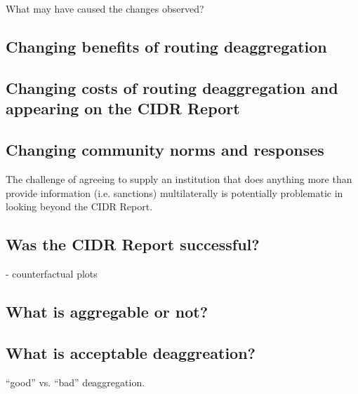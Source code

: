 \chapter{}
\label{chap:discussion}


What may have caused the changes observed?

\section{Changing benefits of routing deaggregation}
\section{Changing costs of routing deaggregation and appearing on the CIDR Report}
\section{Changing community norms and responses}


The challenge of agreeing to supply an institution that does anything more than provide information (i.e. sanctions) multilaterally is potentially problematic in looking beyond the CIDR Report.


\section{Was the CIDR Report successful?}
- counterfactual plots
\section{What is aggregable or not?}
\section{What is acceptable deaggreation?}
``good'' vs. ``bad'' deaggregation.